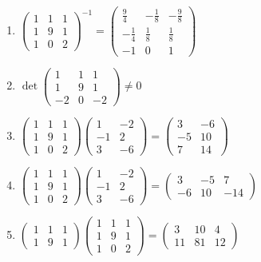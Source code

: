 \documentclass[11pt,a4paper]{article}
\begin{document}
\begin{enumerate}
\item $\displaystyle \begin{pmatrix} 1 & 1 & 1 \\ 1 & 9 & 1 \\ 1 & 0 & 2 \end{pmatrix}^{-1} = \begin{pmatrix} \frac{9}{4} & -\frac{1}{8} & -\frac{9}{8} \\ -\frac{1}{4} & \frac{1}{8} & \frac{1}{8} \\ -1 & 0 & 1 \end{pmatrix}$
\item $\displaystyle \det \begin{pmatrix} 1 & 1 & 1 \\ 1 & 9 & 1 \\ -2 & 0 & -2 \end{pmatrix} \neq 0$
\item $\displaystyle \begin{pmatrix} 1 & 1 & 1 \\ 1 & 9 & 1 \\ 1 & 0 & 2 \end{pmatrix} \begin{pmatrix} 1 & -2 \\ -1 & 2 \\ 3 & -6 \end{pmatrix} = \begin{pmatrix} 3 & -6 \\ -5 & 10 \\ 7 & 14 \end{pmatrix}$
\item $\displaystyle \begin{pmatrix} 1 & 1 & 1 \\ 1 & 9 & 1 \\ 1 & 0 & 2 \end{pmatrix} \begin{pmatrix} 1 & -2 \\ -1 & 2 \\ 3 & -6 \end{pmatrix} = \begin{pmatrix} 3 & -5 & 7 \\ -6 & 10 & -14 \end{pmatrix}$
\item $\displaystyle \begin{pmatrix} 1 & 1 & 1 \\ 1 & 9 & 1 \end{pmatrix} \begin{pmatrix} 1 & 1 & 1 \\ 1 & 9 & 1 \\ 1 & 0 & 2 \end{pmatrix} = \begin{pmatrix} 3 & 10 & 4 \\ 11 & 81 & 12 \end{pmatrix}$

\end{enumerate}
\end{document}
